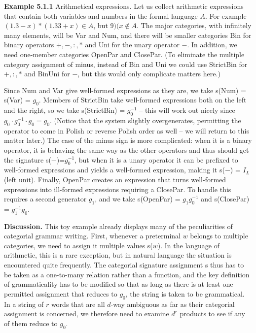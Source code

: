 \smallskip
\noindent
{\bf Example 5.1.1} Arithmetical expressions. Let us collect arithmetic
expressions that contain both variables and numbers in the formal language
$A$. For example $(1.3-x)*(1.33+x) \in A$, but $9)(x \not\in A$.  The major
categories, with infinitely many elements, will be Var and Num, and there will
be smaller categories Bin for binary operators $+,-,:,*$ and Uni for the unary
operator $-$. In addition, we need one-member categories OpenPar and ClosePar.
(To eliminate the multiple category assignment of minus, instead of Bin and Uni
we could use StrictBin for $+,:,*$ and BinUni for $-$, but this would only
complicate matters here.)

Since Num and Var give well-formed expressions as they are, we take s(Num) =
s(Var) = $g_0$. Members of StrictBin take well-formed expressions both on the
left and the right, so we take s(StrictBin) = $g_0^{-1}$ -- this will work out
nicely since $g_0 \cdot g_0^{-1} \cdot g_0 = g_0$. (Notice that the system 
slightly overgenerates, permitting the operator to come in Polish or reverse 
Polish order as well -- we will return to this matter later.) 
The case of the minus sign is more complicated: when it is a binary operator,
it is behaving the same way as the other operators and thus should get the
signature s($-$)=$g_0^{-1}$, but when it is a unary operator it can be prefixed
to well-formed expressions and yields a well-formed expression, making it
s($-$) = $I_L$ (left unit). Finally, OpenPar creates an expression that turns
well-formed expressions into ill-formed expressions requiring a ClosePar. To
handle this requires a second generator $g_1$, and we take
s(OpenPar) = $g_1g_0^{-1}$ and s(ClosePar) = $g_1^{-1}g_0$. 

\smallskip
\noindent
{\bf Discussion.} This toy example already displays many of the peculiarities
of categorial grammar writing. First, whenever a preterminal $w$ belongs to
multiple categories, we need to assign it multiple values s($w$). In the
language of arithmetic, this is a rare exception, but in natural language the
situation is encountered quite frequently. The categorial signature assignment
s thus has to be taken as a one-to-many relation rather than a function, and
the key definition of grammaticality has to be modified so that as long as
there is at least one permitted assignment that reduces to $g_0$, the string
is taken to be grammatical. In a string of $r$ words that are all $d$-way
ambiguous as far as their categorial assignment is concerned, we therefore
need to examine $d^r$ products to see if any of them reduce to $g_0$. 

